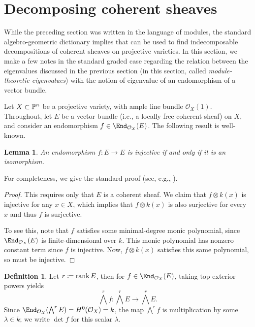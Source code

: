 \documentclass[12pt]{article}
\def\OO{\mathcal O}
\theoremstyle{theorem}
\numberwithin{thm}{section}
\newtheorem{lem}[thm]{Lemma}
\theoremstyle{definition}
\newtheorem{dfn}[thm]{Definition}
\begin{document}
\section{Decomposing coherent sheaves}\label{sec:coherent}

While the preceding section was written in the language of modules, the standard algebro-geometric dictionary implies that  can be used to find indecomposable decompositions of coherent sheaves on projective varieties.
In this section, we make a few notes in the standard graded case regarding the relation between the eigenvalues discussed in the previous section (in this section, called \emph{module-theoretic eigenvalues}) with the notion of eigenvalue of an endomorphism of a vector bundle.

Let $X\subset \P^n$ be a projective variety, with ample line bundle $\OO_X(1)$.
Throughout, let $E$ be a vector bundle (i.e., a locally free coherent sheaf) on $X$, and consider an endomorphism $f\in\End_{\OO_X}(E)$. The following result is well-known.

\begin{lem}\label{lem:inj-iff-iso}
  An endomorphism $f\colon E\to E$ is injective if and only if it is an isomorphism.
\end{lem}

For completeness, we give the standard proof (see, e.g., \cite[Exercise~4.1]{Friedman98}).

\begin{proof}
  This requires only that $E$ is a coherent sheaf. We claim that $f\otimes k(x)$ is injective for any $x\in X$, which implies that $f\otimes k(x)$ is also surjective for every $x$ and thus $f$ is surjective.

  To see this, note that $f$ satisfies some minimal-degree monic polynomial, since $\End_{\OO_X}(E)$ is finite-dimensional over $k$. This monic polynomial has nonzero constant term since $f$ is injective. Now, $f\otimes k(x)$ satisfies this same polynomial, so must be injective.
\end{proof}

\begin{dfn}
  Let $r\coloneqq\rank E$, then for $f\in \End_{\OO_X}(E)$, taking top exterior powers yields
  \[\textstyle \bigwedge^r f\colon \bigwedge^r E \to \bigwedge^r E. \]
  Since $\End_{\OO_X}(\bigwedge^r E) = H^0(\OO_X)=k$, the map $\bigwedge^r f$ is multiplication by some $\lambda\in k$; we write $\det f$ for this scalar $\lambda$.
\end{dfn}
\end{document}
